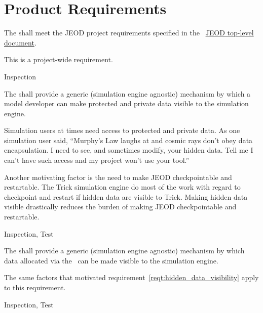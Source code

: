 %
% 

\chapter{Product Requirements}
\label{ch:reqt}

\label{reqt:toplevel}
\begin{description:}
\item[Requirement]
  The \ModelDesc shall meet the JEOD project requirements specified in
  the \JEODid\
  \hyperref{file:\JEODHOME/docs/JEOD.pdf}{part1}{reqt}
           {JEOD top-level document}.
\item[Rationale]
  This is a project-wide requirement.
\item[Verification]
  Inspection 
\end{description:}

\label{reqt:hidden_data_visibility}
\begin{description:}
\item[Requirement]
  The \ModelDesc shall provide a generic (simulation engine agnostic) mechanism
  by which a model developer can make protected and private data visible to the
  simulation engine.
\item[Rationale]
  Simulation users at times need access to protected and private data.
  As one simulation user said, ``Murphy's Law laughs at and cosmic rays don't
  obey data encapsulation. I need to see, and sometimes modify, your hidden
  data. Tell me I can't have such access and my project won't use your tool.''

  Another motivating factor is the need to make JEOD checkpointable and
  restartable. The Trick simulation engine do most of the work with regard
  to checkpoint and restart if hidden data are visible to Trick. Making
  hidden data visible drastically reduces the burden of making JEOD
  checkpointable and restartable.
\item[Verification]
  Inspection, Test 
\end{description:}


\label{reqt:allocated_data_visibility}
\begin{description:}
\item[Requirement]
  The \ModelDesc shall provide a generic (simulation engine agnostic) mechanism
  by which data allocated via the \MEMORY\ can be made visible to the
  simulation engine.
\item[Rationale]
  The same factors that motivated requirement~\ref{reqt:hidden_data_visibility}
  apply to this requirement.
\item[Verification]
  Inspection, Test 
\end{description:}


